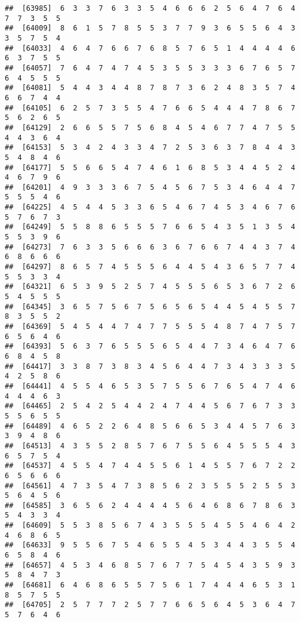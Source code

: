 \documentclass[
]{book}
\begin{document}
\begin{verbatim}
##  [63985]  6  3  3  7  6  3  3  5  4  6  6  6  2  5  6  4  7  6  4  7  7  3  5  5
##  [64009]  8  6  1  5  7  8  5  5  3  7  7  9  3  6  5  5  6  4  3  3  5  7  5  4
##  [64033]  4  6  4  7  6  6  7  6  8  5  7  6  5  1  4  4  4  4  6  6  3  7  5  5
##  [64057]  7  6  4  7  4  7  4  5  3  5  5  3  3  3  6  7  6  5  7  6  4  5  5  5
##  [64081]  5  4  4  3  4  4  8  7  8  7  3  6  2  4  8  3  5  7  4  6  6  7  4  4
##  [64105]  6  2  5  7  3  5  5  4  7  6  6  5  4  4  4  7  8  6  7  5  6  2  6  5
##  [64129]  2  6  6  5  5  7  5  6  8  4  5  4  6  7  7  4  7  5  5  4  4  3  6  4
##  [64153]  5  3  4  2  4  3  3  4  7  2  5  3  6  3  7  8  4  4  3  5  4  8  4  6
##  [64177]  5  5  6  6  5  4  7  4  6  1  6  8  5  3  4  4  5  2  4  4  6  7  9  6
##  [64201]  4  9  3  3  3  6  7  5  4  5  6  7  5  3  4  6  4  4  7  5  5  5  4  6
##  [64225]  4  5  4  4  5  3  3  6  5  4  6  7  4  5  3  4  6  7  6  5  7  6  7  3
##  [64249]  5  5  8  8  6  5  5  5  7  6  6  5  4  3  5  1  3  5  4  5  5  3  9  6
##  [64273]  7  6  3  3  5  6  6  6  3  6  7  6  6  7  4  4  3  7  4  6  8  6  6  6
##  [64297]  8  6  5  7  4  5  5  5  6  4  4  5  4  3  6  5  7  7  4  5  5  3  3  4
##  [64321]  6  5  3  9  5  2  5  7  4  5  5  5  6  5  3  6  7  2  6  5  4  5  5  5
##  [64345]  3  6  5  7  5  6  7  5  6  5  6  5  4  4  5  4  5  5  7  8  3  5  5  2
##  [64369]  5  4  5  4  4  7  4  7  7  5  5  5  4  8  7  4  7  5  7  6  5  6  4  6
##  [64393]  5  6  3  7  6  5  5  5  6  5  4  4  7  3  4  6  4  7  6  6  8  4  5  8
##  [64417]  3  3  8  7  3  8  3  4  5  6  4  4  7  3  4  3  3  3  5  4  2  5  8  6
##  [64441]  4  5  5  4  6  5  3  5  7  5  5  6  7  6  5  4  7  4  6  4  4  4  6  3
##  [64465]  2  5  4  2  5  4  4  2  4  7  4  4  5  6  7  6  7  3  3  5  5  6  5  5
##  [64489]  4  6  5  2  2  6  4  8  5  6  6  5  3  4  4  5  7  6  3  3  9  4  8  6
##  [64513]  4  3  5  5  2  8  5  7  6  7  5  5  6  4  5  5  5  4  3  6  5  7  5  4
##  [64537]  4  5  5  4  7  4  4  5  5  6  1  4  5  5  7  6  7  2  2  6  5  6  6  6
##  [64561]  4  7  3  5  4  7  3  8  5  6  2  3  5  5  5  2  5  5  3  5  6  4  5  6
##  [64585]  3  6  5  6  2  4  4  4  4  5  6  4  6  8  6  7  8  6  3  5  4  3  3  4
##  [64609]  5  5  3  8  5  6  7  4  3  5  5  5  4  5  5  4  6  4  2  4  6  8  6  5
##  [64633]  9  5  5  6  7  5  4  6  5  5  4  5  3  4  4  3  5  5  4  6  5  8  4  6
##  [64657]  4  5  3  4  6  8  5  7  6  7  7  5  4  5  4  3  5  9  3  5  8  4  7  3
##  [64681]  6  4  6  8  6  5  5  7  5  6  1  7  4  4  4  6  5  3  1  8  5  7  5  5
##  [64705]  2  5  7  7  7  2  5  7  7  6  6  5  6  4  5  3  6  4  7  5  7  6  4  6

\end{verbatim}
\end{document}
